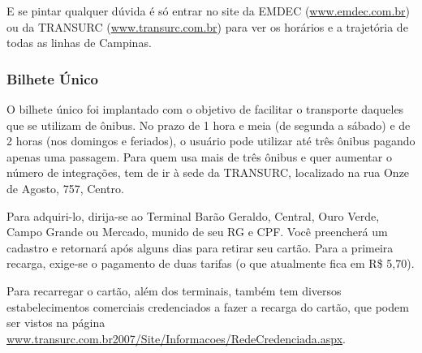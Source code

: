 E se pintar qualquer dúvida é só entrar no site da EMDEC
(\url{www.emdec.com.br}) ou da TRANSURC
(\url{www.transurc.com.br}) para ver os horários e a trajetória de todas
as linhas de Campinas.

\subsubsection{Bilhete Único}

O bilhete único foi implantado com o objetivo de facilitar o transporte daqueles
que se utilizam de ônibus. No prazo de 1 hora e meia (de segunda a sábado) e de
2 horas (nos domingos e feriados), o usuário pode utilizar até três ônibus
pagando apenas uma passagem. Para quem usa mais de três ônibus e quer aumentar
o número de integrações, tem de ir à sede da TRANSURC, localizado na rua Onze de
Agosto, 757, Centro.

Para adquiri-lo, dirija-se ao Terminal Barão Geraldo, Central, Ouro Verde, Campo
Grande ou Mercado, munido de seu RG e CPF. Você preencherá um cadastro
e retornará após alguns dias para retirar seu cartão. Para a primeira recarga,
exige-se o pagamento de duas tarifas (o que atualmente fica em R\$ 5,70).

Para recarregar o cartão, além dos terminais, também tem diversos
estabelecimentos comerciais credenciados a fazer a recarga do cartão, que podem
ser vistos na página
\url{www.transurc.com.br2007/Site/Informacoes/RedeCredenciada.aspx}.
